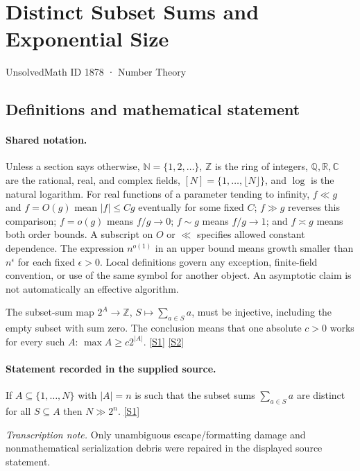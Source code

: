 \documentclass[11pt,a4paper]{article}
\newcommand{\N}{\mathbb{N}}
\newcommand{\Z}{\mathbb{Z}}
\newcommand{\Q}{\mathbb{Q}}
\newcommand{\R}{\mathbb{R}}
\newcommand{\C}{\mathbb{C}}
\newcommand{\sref}[2]{\hyperlink{source:#1:#2}{[S#2]}}
\begin{document}

\setcounter{section}{1877}

\section{Distinct Subset Sums and Exponential Size}\label{1878}

{\small\sffamily UnsolvedMath ID 1878 · Number Theory}

\subsection{Definitions and mathematical statement}

\paragraph{Shared notation.}Unless a section says otherwise, $\N=\{1,2,\ldots\}$,
$\Z$ is the ring of integers, $\Q,\R,\C$ are the rational, real, and complex
fields, $[N]=\{1,\ldots,\lfloor N\rfloor\}$, and $\log$ is the natural
logarithm. For real functions of a parameter tending to infinity,
$f\ll g$ and $f=O(g)$ mean $|f|\leq Cg$ eventually for some fixed $C$;
$f\gg g$ reverses this comparison; $f=o(g)$ means $f/g\to0$;
$f\sim g$ means $f/g\to1$; and $f\asymp g$ means both order bounds.
A subscript on $O$ or $\ll$ specifies allowed constant dependence.
The expression $n^{o(1)}$ in an upper bound means growth smaller than
$n^\epsilon$ for each fixed $\epsilon>0$. Local definitions govern any
exception, finite-field convention, or use of the same symbol for another
object. An asymptotic claim is not automatically an effective algorithm.



The subset-sum map $2^A\to\Z$, $S\mapsto\sum_{a\in S}a$, must be injective, including the empty subset with sum zero. The conclusion means that one absolute $c>0$ works for every such $A$: $\max A\geq c2^{|A|}$. \sref{1878}{1} \sref{1878}{2}

\paragraph{Statement recorded in the supplied source.}
If $A\subseteq \{1,\ldots,N\}$ with $\lvert A\rvert=n$ is such that the subset sums $\sum_{a\in S}a$ are distinct for all $S\subseteq A$ then $ N \gg 2^{n}. $ \sref{1878}{1}

{\small\emph{Transcription note.} Only unambiguous escape/formatting damage and nonmathematical serialization debris were repaired in the displayed source statement.}
\end{document}
